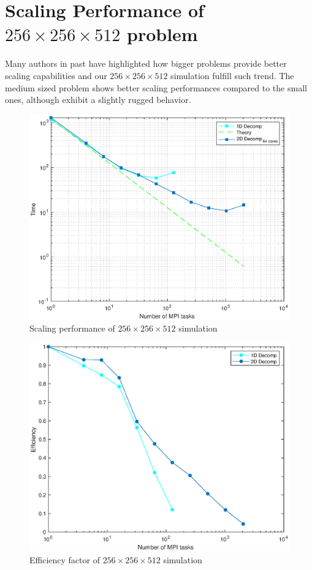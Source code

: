 \section{Scaling Performance of $256\times 256\times 512$ problem}
Many authors in past have highlighted how bigger problems provide better scaling capabilities and our $256\times 256\times 512$ simulation fulfill such trend.
The medium sized problem shows better scaling performances compared to the small ones, although exhibit a slightly rugged behavior.
\par
\begin{figure}
\begin{center}
\includegraphics[scale=0.55]{grafici/1281}
\caption{Scaling performance of $256\times 256\times 512$  simulation}
\label{1281}
\end{center}
\end{figure}

\begin{figure}
\begin{center}
\includegraphics[scale=0.55]{grafici/1283}
\caption{Efficiency factor of $256\times 256\times 512$  simulation}
\label{1283}
\end{center}
\end{figure}

